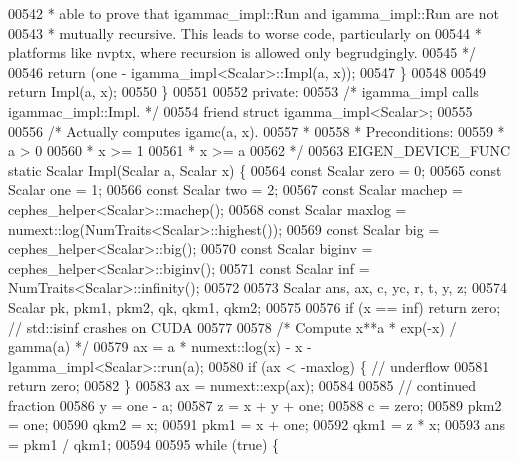 \begin{DoxyCode}
00542 \textcolor{comment}{       * able to prove that igammac\_impl::Run and igamma\_impl::Run are not}
00543 \textcolor{comment}{       * mutually recursive.  This leads to worse code, particularly on}
00544 \textcolor{comment}{       * platforms like nvptx, where recursion is allowed only begrudgingly.}
00545 \textcolor{comment}{       */}
00546       \textcolor{keywordflow}{return} (one - igamma\_impl<Scalar>::Impl(a, x));
00547     \}
00548 
00549     \textcolor{keywordflow}{return} Impl(a, x);
00550   \}
00551 
00552  \textcolor{keyword}{private}:
00553   \textcolor{comment}{/* igamma\_impl calls igammac\_impl::Impl. */}
00554   \textcolor{keyword}{friend} \textcolor{keyword}{struct }igamma\_impl<Scalar>;
00555 
00556   \textcolor{comment}{/* Actually computes igamc(a, x).}
00557 \textcolor{comment}{   *}
00558 \textcolor{comment}{   * Preconditions:}
00559 \textcolor{comment}{   *   a > 0}
00560 \textcolor{comment}{   *   x >= 1}
00561 \textcolor{comment}{   *   x >= a}
00562 \textcolor{comment}{   */}
00563   EIGEN\_DEVICE\_FUNC \textcolor{keyword}{static} Scalar Impl(Scalar a, Scalar x) \{
00564     \textcolor{keyword}{const} Scalar zero = 0;
00565     \textcolor{keyword}{const} Scalar one = 1;
00566     \textcolor{keyword}{const} Scalar two = 2;
00567     \textcolor{keyword}{const} Scalar machep = cephes\_helper<Scalar>::machep();
00568     \textcolor{keyword}{const} Scalar maxlog = numext::log(NumTraits<Scalar>::highest());
00569     \textcolor{keyword}{const} Scalar big = cephes\_helper<Scalar>::big();
00570     \textcolor{keyword}{const} Scalar biginv = cephes\_helper<Scalar>::biginv();
00571     \textcolor{keyword}{const} Scalar inf = NumTraits<Scalar>::infinity();
00572 
00573     Scalar ans, ax, c, yc, r, t, y, z;
00574     Scalar pk, pkm1, pkm2, qk, qkm1, qkm2;
00575 
00576     \textcolor{keywordflow}{if} (x == inf) \textcolor{keywordflow}{return} zero;  \textcolor{comment}{// std::isinf crashes on CUDA}
00577 
00578     \textcolor{comment}{/* Compute  x**a * exp(-x) / gamma(a)  */}
00579     ax = a * numext::log(x) - x - lgamma\_impl<Scalar>::run(a);
00580     \textcolor{keywordflow}{if} (ax < -maxlog) \{  \textcolor{comment}{// underflow}
00581       \textcolor{keywordflow}{return} zero;
00582     \}
00583     ax = numext::exp(ax);
00584 
00585     \textcolor{comment}{// continued fraction}
00586     y = one - a;
00587     z = x + y + one;
00588     c = zero;
00589     pkm2 = one;
00590     qkm2 = x;
00591     pkm1 = x + one;
00592     qkm1 = z * x;
00593     ans = pkm1 / qkm1;
00594 
00595     \textcolor{keywordflow}{while} (\textcolor{keyword}{true}) \{

\end{DoxyCode}
